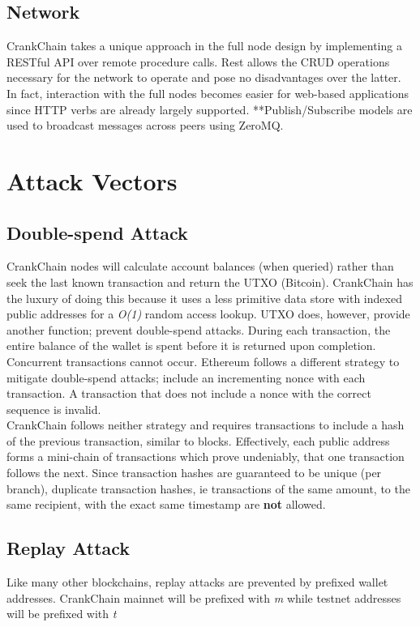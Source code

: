 \documentclass[10pt,twocolumn]{article}
\begin{document}
\subsection{Network}
CrankChain takes a unique approach in the full node design by implementing a RESTful API over remote procedure calls.  Rest allows the CRUD operations necessary for the network to operate and pose no disadvantages over the latter.  In fact, interaction with the full nodes becomes easier for web-based applications since HTTP verbs are already largely supported.
**Publish/Subscribe models are used to broadcast messages across peers using ZeroMQ.


\section{Attack Vectors}
\subsection{Double-spend Attack}
CrankChain nodes will calculate account balances (when queried) rather than seek the last known transaction and return the UTXO (Bitcoin).  CrankChain has the luxury of doing this because it uses a less primitive data store with indexed public addresses for a \textit{O(1)} random access lookup.  UTXO does, however, provide another function; prevent double-spend attacks.  During each transaction, the entire balance of the wallet is spent before it is returned upon completion.  Concurrent transactions cannot occur.  Ethereum follows a different strategy to mitigate double-spend attacks; include an incrementing nonce with each transaction.  A transaction that does not include a nonce with the correct sequence is invalid.\\
CrankChain follows neither strategy and requires transactions to include a hash of the previous transaction, similar to blocks.  Effectively, each public address forms a mini-chain of transactions which prove undeniably, that one transaction follows the next.  Since transaction hashes are guaranteed to be unique (per branch), duplicate transaction hashes, ie transactions of the same amount, to the same recipient, with the exact same timestamp are \textbf{not} allowed.
\subsection{Replay Attack}
Like many other blockchains, replay attacks are prevented by prefixed wallet addresses.  CrankChain mainnet will be prefixed with \textit{m} while testnet addresses will be prefixed with \textit{t}
\end{document}
